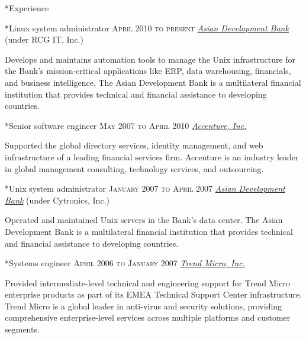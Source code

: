 \documentclass[10pt, a4paper, final]{article}
\begin{document}
\hfill
\begin{minipage}[t]{0.65\linewidth}
  \begin{section}*{Experience}
    \begin{subsection}*{Linux system administrator \hfill\textsc{April 2010 to present}}
      \href{http://www.adb.org/}{\textit{Asian Development Bank}} (under RCG IT, Inc.)

      Develops and maintains automation tools to manage the Unix infrastructure for the Bank's mission-critical applications like ERP, data warehousing, financials, and business intelligence. The Asian Development Bank is a multilateral financial institution that provides technical and financial assistance to developing countries.
    \end{subsection}
    \vspace{1em}
  
    \begin{subsection}*{Senior software engineer \hfill\textsc{May 2007 to April 2010}}
      \href{http://www.accenture.com}{\textit{Accenture, Inc.}} 

      Supported the global directory services, identity management, and web infrastructure of a leading financial services firm. Accenture is an industry leader in global management consulting, technology services, and outsourcing.
    \end{subsection}
    \vspace{1em}
  
    \begin{subsection}*{Unix system administrator \hfill\textsc{January 2007 to April 2007}}
      \href{http://www.adb.org}{\textit{Asian Development Bank}} (under Cytronics, Inc.)

      Operated and maintained Unix servers in the Bank's data center. The Asian Development Bank is a multilateral financial institution that provides technical and financial assistance to developing countries.
    \end{subsection}
    \vspace{1em}
  
    \begin{subsection}*{Systems engineer \hfill\textsc{April 2006 to January 2007}}
      \href{http://www.trendmicro.com}{\textit{Trend Micro, Inc.}} 

      Provided intermediate-level technical and engineering support for Trend Micro enterprise products as part of its EMEA Technical Support Center infrastructure. Trend Micro is a global leader in anti-virus and security solutions, providing comprehensive enterprise-level services across multiple platforms and customer segments.
    \end{subsection}
    \vspace{1em}
  

\end{section}
\end{minipage}
\end{document}
